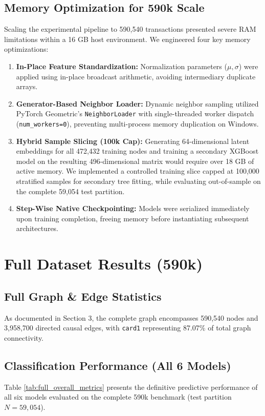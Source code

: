 \documentclass[11pt,a4paper]{report}
\begin{document}
\subsection{Memory Optimization for 590k Scale}
Scaling the experimental pipeline to 590,540 transactions presented severe RAM limitations within a 16 GB host environment. We engineered four key memory optimizations:
\begin{enumerate}
    \item \textbf{In-Place Feature Standardization:} Normalization parameters ($\mu, \sigma$) were applied using in-place broadcast arithmetic, avoiding intermediary duplicate arrays.
    \item \textbf{Generator-Based Neighbor Loader:} Dynamic neighbor sampling utilized PyTorch Geometric's \texttt{NeighborLoader} with single-threaded worker dispatch (\texttt{num\_workers=0}), preventing multi-process memory duplication on Windows.
    \item \textbf{Hybrid Sample Slicing (100k Cap):} Generating 64-dimensional latent embeddings for all 472,432 training nodes and training a secondary XGBoost model on the resulting 496-dimensional matrix would require over 18 GB of active memory. We implemented a controlled training slice capped at 100,000 stratified samples for secondary tree fitting, while evaluating out-of-sample on the complete 59,054 test partition.
    \item \textbf{Step-Wise Native Checkpointing:} Models were serialized immediately upon training completion, freeing memory before instantiating subsequent architectures.
\end{enumerate}

\newpage
\section{Full Dataset Results (590k)}

\subsection{Full Graph \& Edge Statistics}
As documented in Section 3, the complete graph encompasses 590,540 nodes and 3,958,700 directed causal edges, with \texttt{card1} representing 87.07\% of total graph connectivity.

\subsection{Classification Performance (All 6 Models)}
Table \ref{tab:full_overall_metrics} presents the definitive predictive performance of all six models evaluated on the complete 590k benchmark (test partition $N = 59,054$).
\end{document}
